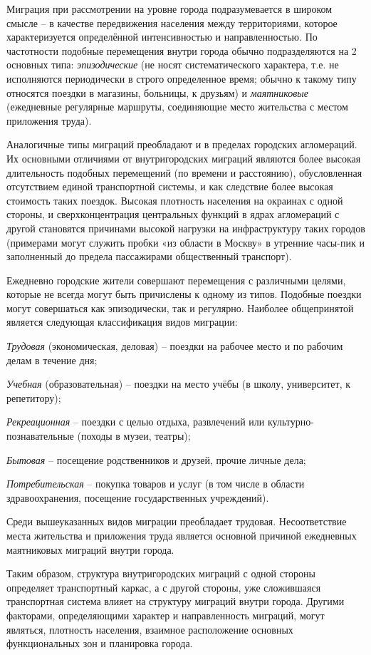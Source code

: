 \documentclass[
  11pt,
  russian,
]{book}
\begin{document}
Миграция при рассмотрении на уровне города подразумевается в широком смысле -- в качестве передвижения населения между территориями, которое характеризуется определённой интенсивностью и направленностью. По частотности подобные перемещения внутри города обычно подразделяются на 2 основных типа: \emph{эпизодические} (не носят систематического характера, т.е. не исполняются периодически в строго определенное время; обычно к такому типу относятся поездки в магазины, больницы, к друзьям) и \emph{маятниковые} (ежедневные регулярные маршруты, соединяющие место жительства с местом приложения труда).

Аналогичные типы миграций преобладают и в пределах городских агломераций. Их основными отличиями от внутригородских миграций являются более высокая длительность подобных перемещений (по времени и расстоянию), обусловленная отсутствием единой транспортной системы, и как следствие более высокая стоимость таких поездок. Высокая плотность населения на окраинах с одной стороны, и сверхконцентрация центральных функций в ядрах агломераций с другой становятся причинами высокой нагрузки на инфраструктуру таких городов (примерами могут служить пробки «из области в Москву» в утренние часы-пик и заполненный до предела пассажирами общественный транспорт).

Ежедневно городские жители совершают перемещения с различными целями, которые не всегда могут быть причислены к одному из типов. Подобные поездки могут совершаться как эпизодически, так и регулярно. Наиболее общепринятой является следующая классификация видов миграции:

\emph{Трудовая} (экономическая, деловая) -- поездки на рабочее место и по рабочим делам в течение дня;

\emph{Учебная} (образовательная) -- поездки на место учёбы (в школу, университет, к репетитору);

\emph{Рекреационная} -- поездки с целью отдыха, развлечений или культурно-познавательные (походы в музеи, театры);

\emph{Бытовая} -- посещение родственников и друзей, прочие личные дела;

\emph{Потребительская} -- покупка товаров и услуг (в том числе в области здравоохранения, посещение государственных учреждений).

Среди вышеуказанных видов миграции преобладает трудовая. Несоответствие места жительства и приложения труда является основной причиной ежедневных маятниковых миграций внутри города.

Таким образом, структура внутригородских миграций с одной стороны определяет транспортный каркас, а с другой стороны, уже сложившаяся транспортная система влияет на структуру миграций внутри города. Другими факторами, определяющими характер и направленность миграций, могут являться, плотность населения, взаимное расположение основных функциональных зон и планировка города.
\end{document}
